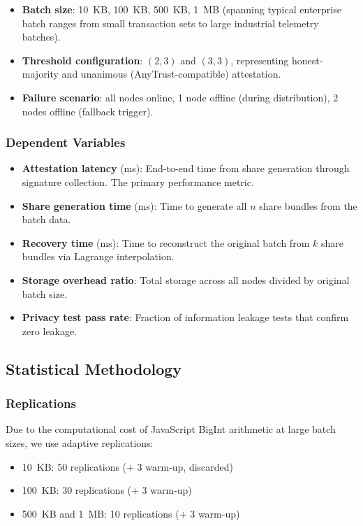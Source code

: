 \begin{itemize}
\item \textbf{Batch size}: 10~KB, 100~KB, 500~KB, 1~MB (spanning typical
  enterprise batch ranges from small transaction sets to large industrial
  telemetry batches).
\item \textbf{Threshold configuration}: $(2,3)$ and $(3,3)$, representing
  honest-majority and unanimous (AnyTrust-compatible) attestation.
\item \textbf{Failure scenario}: all nodes online, 1 node offline (during
  distribution), 2 nodes offline (fallback trigger).
\end{itemize}

\subsubsection{Dependent Variables}

\begin{itemize}
\item \textbf{Attestation latency} (ms): End-to-end time from share
  generation through signature collection. The primary performance metric.
\item \textbf{Share generation time} (ms): Time to generate all $n$ share
  bundles from the batch data.
\item \textbf{Recovery time} (ms): Time to reconstruct the original batch
  from $k$ share bundles via Lagrange interpolation.
\item \textbf{Storage overhead ratio}: Total storage across all nodes
  divided by original batch size.
\item \textbf{Privacy test pass rate}: Fraction of information leakage
  tests that confirm zero leakage.
\end{itemize}

\subsection{Statistical Methodology}

\subsubsection{Replications}

Due to the computational cost of JavaScript BigInt arithmetic at large
batch sizes, we use adaptive replications:

\begin{itemize}
\item 10~KB: 50 replications (+ 3 warm-up, discarded)
\item 100~KB: 30 replications (+ 3 warm-up)
\item 500~KB and 1~MB: 10 replications (+ 3 warm-up)
\end{itemize}

